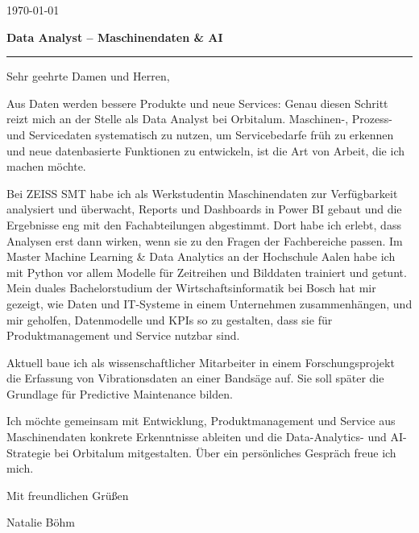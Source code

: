 \documentclass[11pt,a4paper]{article}
\newcommand{\Briefdatum}{\today}
\begin{document}
\color{CVText}

{\raggedleft \Briefdatum\par}
\vspace{5mm}
{\large\bfseries\textcolor{CVPrimary}{Data Analyst – Maschinendaten \& AI}}\par
{\color{CVPrimary}\rule{\linewidth}{0.6pt}}\par
\vspace{1mm}

Sehr geehrte Damen und Herren, 

Aus Daten werden bessere Produkte und neue Services: Genau diesen Schritt reizt mich an der Stelle als Data Analyst bei Orbitalum. Maschinen-, Prozess- und Servicedaten systematisch zu nutzen, um Servicebedarfe früh zu erkennen und neue datenbasierte Funktionen zu entwickeln, ist die Art von Arbeit, die ich machen möchte.

Bei ZEISS SMT habe ich als Werkstudentin Maschinendaten zur Verfügbarkeit analysiert und überwacht, Reports und Dashboards in Power BI gebaut und die Ergebnisse eng mit den Fachabteilungen abgestimmt. Dort habe ich erlebt, dass Analysen erst dann wirken, wenn sie zu den Fragen der Fachbereiche passen. Im Master Machine Learning \& Data Analytics an der Hochschule Aalen habe ich mit Python vor allem Modelle für Zeitreihen und Bilddaten trainiert und getunt. Mein duales Bachelorstudium der Wirtschaftsinformatik bei Bosch hat mir gezeigt, wie Daten und IT-Systeme in einem Unternehmen zusammenhängen, und mir geholfen, Datenmodelle und KPIs so zu gestalten, dass sie für Produktmanagement und Service nutzbar sind.

Aktuell baue ich als wissenschaftlicher Mitarbeiter in einem Forschungsprojekt die Erfassung von Vibrationsdaten an einer Bandsäge auf. Sie soll später die Grundlage für Predictive Maintenance bilden.

Ich möchte gemeinsam mit Entwicklung, Produktmanagement und Service aus Maschinendaten konkrete Erkenntnisse ableiten und die Data-Analytics- und AI-Strategie bei Orbitalum mitgestalten. Über ein persönliches Gespräch freue ich mich.

Mit freundlichen Grüßen

\vspace{6mm}
Natalie Böhm
\end{document}
